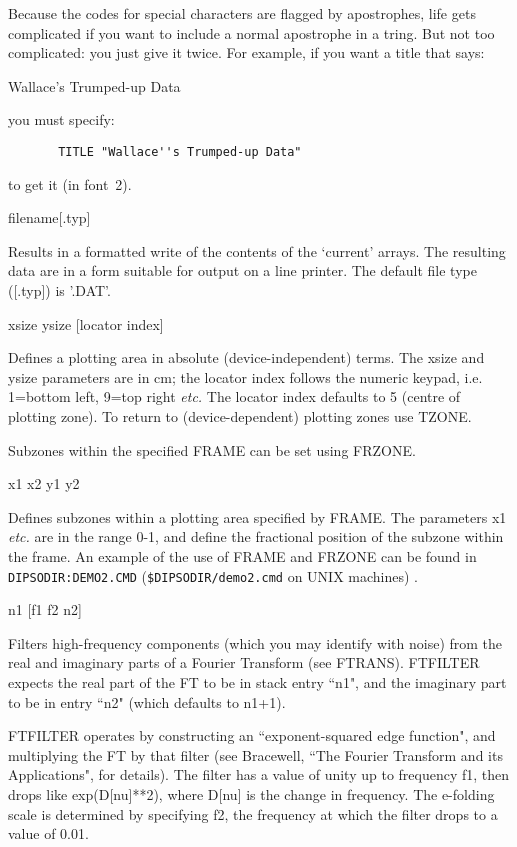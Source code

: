 \begin {description}
Because the codes for special characters are flagged by apostrophes,
life gets complicated if you want to include a normal apostrophe in a
tring.  But not too complicated:  you just give it twice. For example,
if you want a title that says:

\begin{center}
Wallace's Trumped-up Data
\end{center}

you must specify:

\begin{verbatim}
       TITLE "Wallace''s Trumped-up Data"
\end{verbatim}

to get it (in font~2).

\item [FORMWR] filename[.typ]

Results in a formatted write of the contents of the `current' arrays.
The resulting data are in a form suitable for output on a line
printer. The default file type ([.typ]) is '.DAT'.

\item [FRAME] xsize ysize [locator index]

Defines a plotting area in absolute (device-independent) terms.  The
xsize and ysize parameters are in cm;  the locator index follows the
numeric keypad, i.e. 1=bottom left, 9=top right {\em etc.}   The
locator index defaults to 5 (centre of plotting zone).   To return to
(device-dependent) plotting zones use TZONE.

Subzones within the specified FRAME can be set using FRZONE.

\item [FRZONE] x1 x2 y1 y2

Defines subzones within a plotting area specified by FRAME. The
parameters x1 {\em etc.} are in the range 0-1, and define the
fractional position of the subzone within the frame. An example of the
use of FRAME and FRZONE can be found in {\tt DIPSODIR:DEMO2.CMD} 
({\tt \$DIPSODIR/demo2.cmd} on UNIX machines) .

\item [FTFILTER] n1 [f1 f2 n2]

Filters high-frequency components (which you may identify with noise)
from the real and imaginary parts of a Fourier Transform (see FTRANS).
FTFILTER expects the real part of the FT to be in stack entry ``n1",
and the imaginary part to be in entry ``n2" (which defaults to n1+1).

FTFILTER operates by constructing an ``exponent-squared edge
function", and multiplying the FT by that filter (see Bracewell, ``The
Fourier Transform and its Applications", for details). The filter has
a value of unity up to frequency f1, then drops like exp(D[nu]**2),
where D[nu] is the change in frequency. The e-folding scale is
determined by specifying f2, the frequency at which the filter drops
to a value of 0.01.


\end{description}
